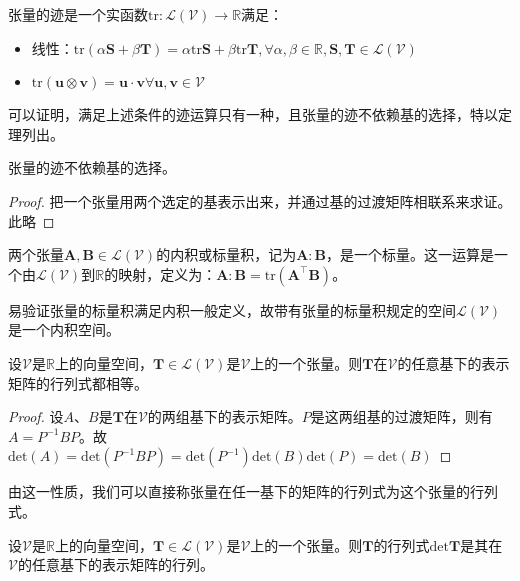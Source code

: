 \documentclass[main.tex]{subfiles}
\begin{document}
\begin{definition}[张量的迹]
张量的迹是一个实函数$\mathrm{tr}:\mathcal{L}\left(\mathcal{V}\right)\rightarrow\mathbb{R}$满足：
\begin{itemize}
    \item 线性：$\mathrm{tr}\left(\alpha\mathbf{S}+\beta\mathbf{T}\right)=\alpha\mathrm{tr}\mathbf{S}+\beta\mathrm{tr}\mathbf{T},\forall\alpha,\beta\in\mathbb{R},\mathbf{S},\mathbf{T}\in\mathcal{L}\left(\mathcal{V}\right)$
    \item $\mathrm{tr}\left(\mathbf{u}\otimes \mathbf{v}\right)=\mathbf{u}\cdot\mathbf{v}\forall\mathbf{u},\mathbf{v}\in\mathcal{V}$
\end{itemize}
\end{definition}

可以证明，满足上述条件的迹运算只有一种\cite[\S Appendix]{Coleman1966}，且张量的迹不依赖基的选择，特以定理列出。

\begin{theorem}
张量的迹不依赖基的选择。
\end{theorem}
\begin{proof}
把一个张量用两个选定的基表示出来，并通过基的过渡矩阵相联系来求证。此略
\end{proof}

\begin{definition}[两个张量的标量积]
两个张量$\mathbf{A},\mathbf{B}\in\mathcal{L}\left(\mathcal{V}\right)$的内积或标量积，记为$\mathbf{A}:\mathbf{B}$，是一个标量。这一运算是一个由$\mathcal{L}\left(\mathcal{V}\right)$到$\mathbb{R}$的映射，定义为：$\mathbf{A}:\mathbf{B}=\mathrm{tr}\left(\mathbf{A}^\intercal\mathbf{B}\right)$。
\end{definition}

易验证张量的标量积满足内积一般定义，故带有张量的标量积规定的空间$\mathcal{L}\left(\mathcal{V}\right)$是一个内积空间。

\begin{theorem}
设$\mathcal{V}$是$\mathbb{R}$上的向量空间，$\mathbf{T}\in\mathcal{L}\left(\mathcal{V}\right)$是$\mathcal{V}$上的一个张量。则$\mathbf{T}$在$\mathcal{V}$的任意基下的表示矩阵的行列式都相等。
\end{theorem}
\begin{proof}
设$A$、$B$是$\mathbf{T}$在$\mathcal{V}$的两组基下的表示矩阵。$P$是这两组基的过渡矩阵，则有$A=P^{-1}BP$。故$\mathrm{det}\left(A\right)=\mathrm{det}\left(P^{-1}BP\right)=\mathrm{det}\left(P^{-1}\right)\mathrm{det}\left(B\right)\mathrm{det}\left(P\right)=\mathrm{det}\left(B\right)$
\end{proof}

由这一性质，我们可以直接称张量在任一基下的矩阵的行列式为这个张量的行列式。

\begin{definition}
设$\mathcal{V}$是$\mathbb{R}$上的向量空间，$\mathbf{T}\in\mathcal{L}\left(\mathcal{V}\right)$是$\mathcal{V}$上的一个张量。则$\mathbf{T}$的行列式$\mathrm{det}\mathbf{T}$是其在$\mathcal{V}$的任意基下的表示矩阵的行列。
\end{definition}
\end{document}

